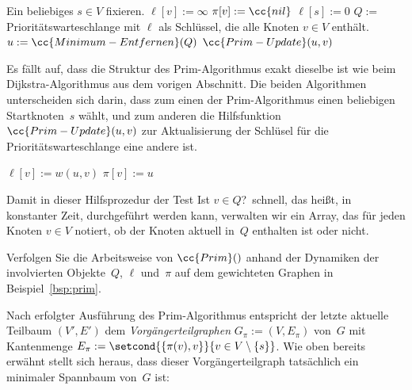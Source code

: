 \begin{algorithm}[H]
\caption{$\cc{Prim}()$}
\begin{algorithmic}[1]
 \STATE Ein beliebiges $s \in V$ fixieren.
 \STATE{}
  \STATE $\ell[v] := \infty$
  \STATE $\pi[v] := \cc{nil}$
 \ENDFOR
 \STATE $\ell[s] := 0$
 \STATE $Q := $ Prioritätswarteschlange mit $\ell$ als Schlüssel, die alle Knoten $v \in V$ enthält.
 \STATE{}
  \STATE $u := \cc{Minimum-Entfernen}(Q)$ 
   \STATE $\cc{Prim-Update}(u,v)$
  \ENDFOR
 \ENDWHILE
\end{algorithmic}
\end{algorithm}

Es fällt auf, dass die Struktur des Prim-Algorithmus exakt dieselbe ist wie beim Dijkstra-Algorithmus aus dem vorigen Abschnitt.
Die beiden Algorithmen unterscheiden sich darin, dass zum einen der Prim-Algorithmus einen beliebigen Startknoten~$s$ wählt, und zum anderen die Hilfsfunktion $\cc{Prim-Update}(u,v)$ zur Aktualisierung der Schlüsel für die Prioritätswarteschlange eine andere ist.

\begin{algorithm}[H]
	\caption{$\cc{Prim-Update}(u,v)$}
	\begin{algorithmic}[1]
		\STATE $\ell[v]:=w(u,v)$
		\STATE $\pi[v] := u$
		\ENDIF
	\end{algorithmic}
\end{algorithm}

Damit in dieser Hilfsprozedur der Test \glqq Ist $v \in Q$?\grqq\ schnell, das heißt, in konstanter Zeit, durchgeführt werden kann, verwalten wir ein Array, das für jeden Knoten $v \in V$ notiert, ob der Knoten aktuell in~$Q$ enthalten ist oder nicht. 

\begin{aufgabe}
Verfolgen Sie die Arbeitsweise von $\cc{Prim}()$ anhand der Dynamiken der involvierten Objekte~$Q$, $\ell$ und~$\pi$ auf dem gewichteten Graphen in Beispiel~\ref{bsp:prim}.
\end{aufgabe}

Nach erfolgter Ausführung des Prim-Algorithmus entspricht der letzte aktuelle Teilbaum $(V',E')$ dem \emph{Vorgängerteilgraphen} $G_\pi := (V,E_\pi)$ von~$G$ mit Kantenmenge $E_\pi := \setcond{ \{\pi(v),v\}}{v \in V \setminus \{s\}}$.
Wie oben bereits erwähnt stellt sich heraus, dass dieser Vorgängerteilgraph tatsächlich ein minimaler Spannbaum von~$G$ ist:

